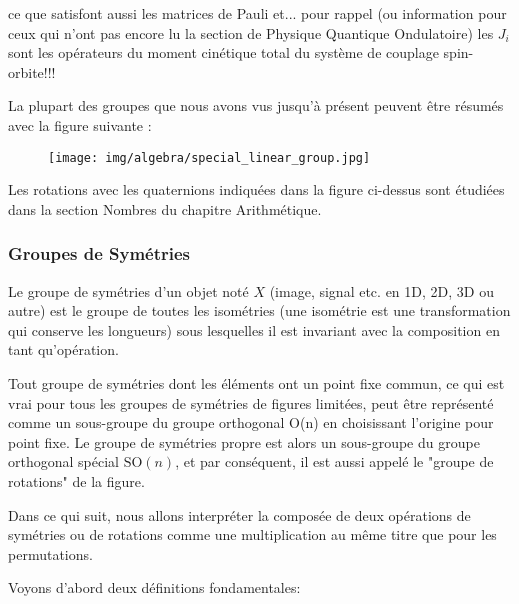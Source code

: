 	ce que satisfont aussi les matrices de Pauli et... pour rappel (ou information pour ceux qui n'ont pas encore lu la section de Physique Quantique Ondulatoire) les $J_i$ sont les opérateurs du moment cinétique total du système de couplage spin-orbite!!!
	
	La plupart des groupes que nous avons vus jusqu'à présent peuvent être résumés avec la figure suivante :
	\begin{figure}[H]
		\centering
		\texttt{[image: img/algebra/special\_linear\_group.jpg]}
	\end{figure}
	Les rotations avec les quaternions indiquées dans la figure ci-dessus sont étudiées dans la section Nombres du chapitre Arithmétique.
	
	\pagebreak
	\subsubsection{Groupes de Symétries}
	Le groupe de symétries d'un objet noté $X$ (image, signal etc. en 1D, 2D, 3D ou autre) est le groupe de toutes les isométries (une isométrie est une transformation qui conserve les longueurs) sous lesquelles il est invariant avec la composition en tant qu'opération.
	
	Tout groupe de symétries dont les éléments ont un point fixe commun, ce qui est vrai pour tous les groupes de symétries de figures limitées, peut être représenté comme un sous-groupe du groupe orthogonal O(n) en choisissant l'origine pour point fixe. Le groupe de symétries propre est alors un sous-groupe du groupe orthogonal spécial $\text{SO}(n)$, et par conséquent, il est aussi appelé le "groupe de rotations" de la figure.
	
	Dans ce qui suit, nous allons interpréter la composée de deux opérations de symétries ou de rotations comme une multiplication au même titre que pour les permutations.
	
	Voyons d'abord deux définitions fondamentales:
	
